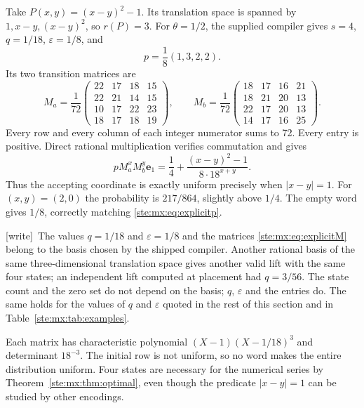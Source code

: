 \documentclass[11pt,letterpaper]{article}
\theoremstyle{definition}
\theoremstyle{remark}
\newcommand{\e}{\mathbf e}
\newcommand{\wtag}{\textup{[write]}}
\begin{document}
Take $P(x,y)=(x-y)^2-1$. Its translation space is spanned by
$1,x-y,(x-y)^2$, so $r(P)=3$. For $\theta=1/2$, the supplied compiler gives
$s=4$, $q=1/18$, $\varepsilon=1/8$, and
\begin{equation}\label{ste:mx:eq:explicitp}
 p=\frac18(1,3,2,2).
\end{equation}
Its two transition matrices are
\begin{equation}\label{ste:mx:eq:explicitM}
 M_a=\frac1{72}
 \begin{pmatrix}
 22&17&18&15\\22&21&14&15\\10&17&22&23\\18&17&18&19
 \end{pmatrix},\qquad
 M_b=\frac1{72}
 \begin{pmatrix}
 18&17&16&21\\18&21&20&13\\22&17&20&13\\14&17&16&25
 \end{pmatrix}.
\end{equation}
Every row and every column of each integer numerator sums to 72. Every entry
is positive. Direct rational multiplication verifies commutation and gives
\begin{equation}\label{ste:mx:eq:explicitidentity}
 pM_a^xM_b^y\e_1
 =\frac14+\frac{(x-y)^2-1}{8\cdot18^{x+y}}.
\end{equation}
Thus the accepting coordinate is exactly uniform precisely when $|x-y|=1$.
For $(x,y)=(2,0)$ the probability is $217/864$, slightly above $1/4$.
The empty word gives $1/8$, correctly matching \eqref{ste:mx:eq:explicitp}.

\wtag\ The values $q=1/18$ and $\varepsilon=1/8$ and the matrices \eqref{ste:mx:eq:explicitM} belong to the basis chosen by the shipped compiler. Another rational basis of the same three-dimensional translation space gives another valid lift with the same four states; an independent lift computed at placement had $q=3/56$. The state count and the zero set do not depend on the basis; $q$, $\varepsilon$ and the entries do. The same holds for the values of $q$ and $\varepsilon$ quoted in the rest of this section and in Table~\ref{ste:mx:tab:examples}.

Each matrix has characteristic polynomial $(X-1)(X-1/18)^3$ and determinant
$18^{-3}$. The initial row is not uniform, so no word makes the entire
distribution uniform. Four states are necessary for the numerical series by
Theorem~\ref{ste:mx:thm:optimal}, even though the predicate $|x-y|=1$ can be studied
by other encodings.
\end{document}
